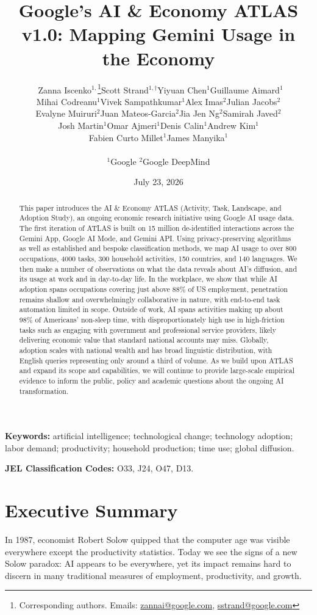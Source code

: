 \documentclass[11pt,a4paper]{article}
\title{Google's AI \& Economy ATLAS v1.0: Mapping Gemini Usage in the Economy}
\author{
    \fontsize{10.5pt}{12pt}\selectfont 
    \begin{tabular}{c c c c}\
        Zanna Iscenko$^{1,}$\thanks{Corresponding authors. Emails: \href{mailto:zannai@google.com}{zannai@google.com}, \href{mailto:sstrand@google.com}{sstrand@google.com}} & Scott Strand$^{1, \dagger}$ & Yiyuan Chen$^1$ & Guillaume Aimard$^1$ \\
        Mihai Codreanu$^1$ & Vivek Sampathkumar$^1$ & Alex Imas$^2$ & Julian Jacobs$^2$ \\
        Evalyne Muiruri$^2$ & Juan Mateos-Garcia$^2$ & Jia Jen Ng$^2$ & Samirah Javed$^2$ \\
        Josh Martin$^1$ & Omar Ajmeri$^1$ & Denis Calin$^1$ & Andrew Kim$^1$ \\
        & Fabien Curto Millet$^1$ & James Manyika$^1$ & \\
    \end{tabular} \\[0.5em]
    \fontsize{9.5pt}{12pt}\selectfont  
    $^1$Google \quad $^2$Google DeepMind
    }
\date{\normalsize July 23, 2026}
\begin{document}
\maketitle


\vspace{-2em} 


\begin{abstract}
\noindent This paper introduces the AI \& Economy ATLAS (Activity, Task, Landscape, and Adoption Study), an ongoing economic research initiative using Google AI usage data. The first iteration of ATLAS is built on 15 million de-identified interactions across the Gemini App, Google AI Mode, and Gemini API. Using privacy-preserving algorithms as well as established and bespoke classification methods, we map AI usage to over 800 occupations, 4000 tasks, 300 household activities, 150 countries, and 140 languages. We then make a number of observations on what the data reveals about AI’s diffusion, and its usage at work and in day-to-day life. In the workplace, we show that while AI adoption spans occupations covering just above 88\% of US employment, penetration remains shallow and overwhelmingly collaborative in nature, with end-to-end task automation limited in scope. Outside of work, AI spans activities making up about 98\% of Americans' non-sleep time, with disproportionately high use in high-friction tasks such as engaging with government and professional service providers, likely delivering economic value that standard national accounts may miss. Globally, adoption scales with national wealth and has broad linguistic distribution, with English queries representing only around a third of volume. As we build upon ATLAS and expand its scope and capabilities, we will continue to provide large-scale empirical evidence to inform the public, policy and academic questions about the ongoing AI transformation.
\end{abstract}

\noindent \textbf{Keywords:} artificial intelligence; technological change; technology adoption; labor demand; productivity; household production; time use; global diffusion.

\noindent \textbf{JEL Classification Codes:} O33, J24, O47, D13.

\newpage

\section{Executive Summary}

In 1987, economist Robert Solow quipped that the computer age was visible everywhere except the productivity statistics. Today we see the signs of a new Solow paradox: AI appears to be everywhere, yet its impact remains hard to discern in many traditional measures of employment, productivity, and growth.
\end{document}
